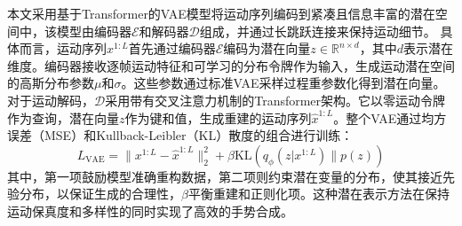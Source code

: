 本文采用基于Transformer的VAE模型将运动序列编码到紧凑且信息丰富的潜在空间中，该模型由编码器$\mathcal{E}$和解码器$\mathcal{D}$组成，并通过长跳跃连接来保持运动细节。
具体而言，运动序列$x^{1:L}$首先通过编码器$\mathcal{E}$编码为潜在向量$z \in \mathbb{R}^{n\times d}$，其中$d$表示潜在维度。编码器接收逐帧运动特征和可学习的分布令牌作为输入，生成运动潜在空间的高斯分布参数$\mu$和$\sigma$。这些参数通过标准VAE采样过程重参数化得到潜在向量。
对于运动解码，$\mathcal{D}$采用带有交叉注意力机制的Transformer架构。它以零运动令牌作为查询，潜在向量$z$作为键和值，生成重建的运动序列$\hat{x}^{1:L}$。整个VAE通过均方误差（MSE）和Kullback-Leibler（KL）散度的组合进行训练：
\begin{equation}
L_{\text{VAE}} = \|x^{1:L} - \hat{x}^{1:L}\|_2^2 + \beta \text{KL}(q_{\phi}(z|x^{1:L})\|p(z))
\label{eq:loss_vae}
\end{equation}
其中，第一项鼓励模型准确重构数据，第二项则约束潜在变量的分布，使其接近先验分布，以保证生成的合理性，$\beta$平衡重建和正则化项。这种潜在表示方法在保持运动保真度和多样性的同时实现了高效的手势合成。

